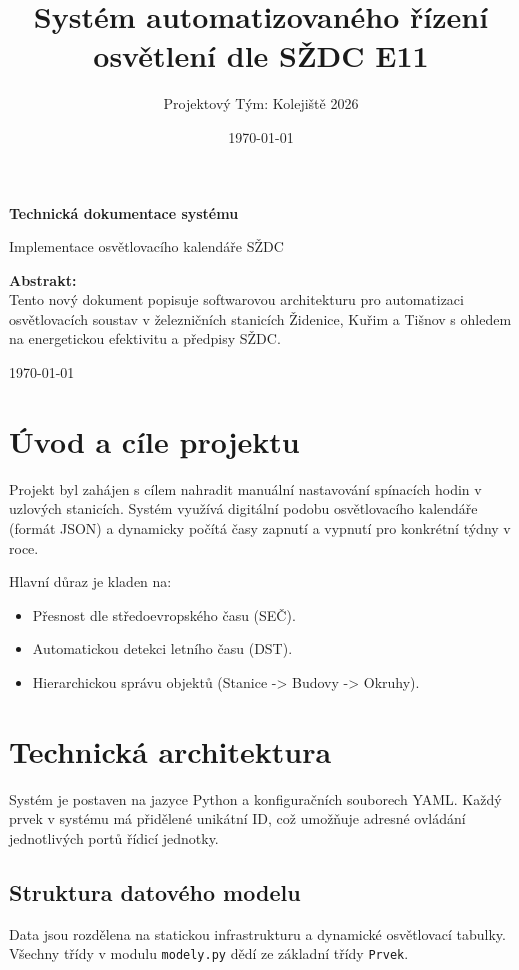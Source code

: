 \documentclass[12pt,a4paper]{article}
\title{Systém automatizovaného řízení osvětlení dle SŽDC E11}
\author{Projektový Tým: Kolejiště 2026}
\date{\today}
\begin{document}
\begin{titlepage}
    \centering
    \vspace*{2cm}
    {\huge\bfseries Technická dokumentace systému\par}
    \vspace{1.5cm}
    {\Large Implementace osvětlovacího kalendáře SŽDC\par}
    \vspace{2cm}
    \textbf{Abstrakt:}\\
    Tento nový dokument popisuje softwarovou architekturu pro automatizaci osvětlovacích soustav v železničních stanicích Židenice, Kuřim a Tišnov s ohledem na energetickou efektivitu a předpisy SŽDC.
    \vfill
    {\large \today \par}
\end{titlepage}

\newpage
\tableofcontents
\thispagestyle{plain}

\section{Úvod a cíle projektu}
Projekt byl zahájen s cílem nahradit manuální nastavování spínacích hodin v uzlových stanicích. Systém využívá digitální podobu osvětlovacího kalendáře (formát JSON) a dynamicky počítá časy zapnutí a vypnutí pro konkrétní týdny v roce.

Hlavní důraz je kladen na:
\begin{itemize}
    \item Přesnost dle středoevropského času (SEČ).
    \item Automatickou detekci letního času (DST).
    \item Hierarchickou správu objektů (Stanice -> Budovy -> Okruhy).
\end{itemize}

\lipsum[1-2] %

\newpage
\section{Technická architektura}
Systém je postaven na jazyce Python a konfiguračních souborech YAML. Každý prvek v systému má přidělené unikátní ID, což umožňuje adresné ovládání jednotlivých portů řídicí jednotky.

\subsection{Struktura datového modelu}
Data jsou rozdělena na statickou infrastrukturu a dynamické osvětlovací tabulky. Všechny třídy v modulu \texttt{modely.py} dědí ze základní třídy \texttt{Prvek}.
\end{document}
